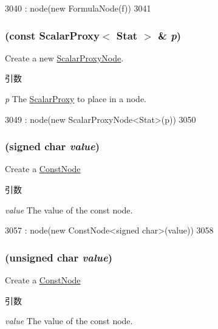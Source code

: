 \begin{DoxyCode}
3040         : node(new FormulaNode(f))
3041     { }
\end{DoxyCode}
\hypertarget{classStats_1_1Temp_ae6dec2a8468340e752ecc91c566fcb59}{
\subsubsection[{Temp}]{ (const {\bf ScalarProxy}$<$ Stat $>$ \& {\em p})}}
\label{classStats_1_1Temp_ae6dec2a8468340e752ecc91c566fcb59}
Create a new \hyperlink{classStats_1_1ScalarProxyNode}{ScalarProxyNode}. 
\begin{DoxyParams}{引数}
\item[{\em p}]The \hyperlink{classStats_1_1ScalarProxy}{ScalarProxy} to place in a node. \end{DoxyParams}



\begin{DoxyCode}
3049         : node(new ScalarProxyNode<Stat>(p))
3050     { }
\end{DoxyCode}
\hypertarget{classStats_1_1Temp_a32edba37410edef9c104eae1073b6ed4}{
\subsubsection[{Temp}]{ (signed char {\em value})}}
\label{classStats_1_1Temp_a32edba37410edef9c104eae1073b6ed4}
Create a \hyperlink{classStats_1_1ConstNode}{ConstNode} 
\begin{DoxyParams}{引数}
\item[{\em value}]The value of the const node. \end{DoxyParams}



\begin{DoxyCode}
3057         : node(new ConstNode<signed char>(value))
3058     { }
\end{DoxyCode}
\hypertarget{classStats_1_1Temp_a5ad95cfa4b7417e92d285d8bdb68b58c}{
\subsubsection[{Temp}]{ (unsigned char {\em value})}}
\label{classStats_1_1Temp_a5ad95cfa4b7417e92d285d8bdb68b58c}
Create a \hyperlink{classStats_1_1ConstNode}{ConstNode} 
\begin{DoxyParams}{引数}
\item[{\em value}]The value of the const node. \end{DoxyParams}



